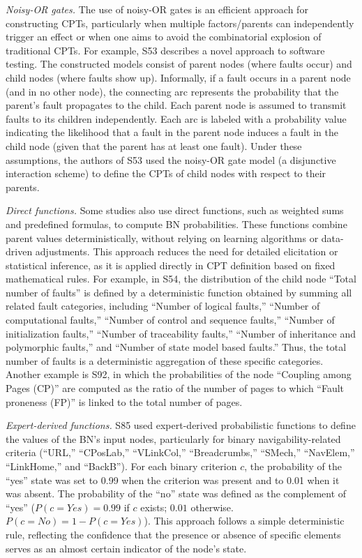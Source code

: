 \textit{Noisy-OR gates.} The use of noisy-OR gates is an efficient approach for constructing CPTs, particularly when multiple factors/parents can independently trigger an effect or when one aims to avoid the combinatorial explosion of traditional CPTs. For example, S53 describes a novel approach to software testing. The constructed models consist of parent nodes (where faults occur) and child nodes (where faults show up). Informally, if a fault occurs in a parent node (and in no other node), the connecting arc represents the probability that the parent's fault propagates to the child. Each parent node is assumed to transmit faults to its children independently. Each arc is labeled with a probability value indicating the likelihood that a fault in the parent node induces a fault in the child node (given that the parent has at least one fault). Under these assumptions, the authors of S53 used the noisy-OR gate model (a disjunctive interaction scheme) to define the CPTs of child nodes with respect to their parents.

\textit{Direct functions.} Some studies also use direct functions, such as weighted sums and predefined formulas, to compute BN probabilities. These functions combine parent values deterministically, without relying on learning algorithms or data-driven adjustments. This approach reduces the need for detailed elicitation or statistical inference, as it is applied directly in CPT definition based on fixed mathematical rules. For example, in S54, the distribution of the child node ``Total number of faults'' is defined by a deterministic function obtained by summing all related fault categories, including ``Number of logical faults,'' ``Number of computational faults,'' ``Number of control and sequence faults,'' ``Number of initialization faults,'' ``Number of traceability faults,'' ``Number of inheritance and polymorphic faults,'' and ``Number of state model based faults.'' Thus, the total number of faults is a deterministic aggregation of these specific categories. Another example is S92, in which the probabilities of the node ``Coupling among Pages (CP)'' are computed as the ratio of the number of pages to which ``Fault proneness (FP)'' is linked to the total number of pages.

\textit{Expert-derived functions.} S85 used expert-derived probabilistic functions to define the values of the BN's input nodes, particularly for binary navigability-related criteria (``URL,'' ``CPosLab,'' ``VLinkCol,'' ``Breadcrumbs,'' ``SMech,'' ``NavElem,'' ``LinkHome,'' and ``BackB''). For each binary criterion $c$, the probability of the ``yes'' state was set to 0.99 when the criterion was present and to 0.01 when it was absent. The probability of the ``no'' state was defined as the complement of ``yes'' ($P(c = Yes) =  0.99$ if $c$ exists; $0.01$ otherwise. $P(c = No) = 1 - P(c = Yes)$). This approach follows a simple deterministic rule, reflecting the confidence that the presence or absence of specific elements serves as an almost certain indicator of the node's state.

